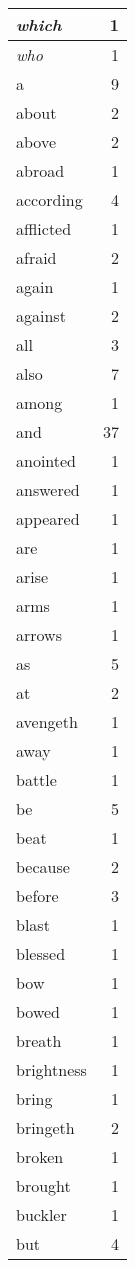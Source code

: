 \begin{center}
\begin{longtable}{l|r}
\emph{which} & 1 \\ \hline
\emph{who} & 1 \\ \hline
a & 9 \\ \hline
about & 2 \\ \hline
above & 2 \\ \hline
abroad & 1 \\ \hline
according & 4 \\ \hline
afflicted & 1 \\ \hline
afraid & 2 \\ \hline
again & 1 \\ \hline
against & 2 \\ \hline
all & 3 \\ \hline
also & 7 \\ \hline
among & 1 \\ \hline
and & 37 \\ \hline
anointed & 1 \\ \hline
answered & 1 \\ \hline
appeared & 1 \\ \hline
are & 1 \\ \hline
arise & 1 \\ \hline
arms & 1 \\ \hline
arrows & 1 \\ \hline
as & 5 \\ \hline
at & 2 \\ \hline
avengeth & 1 \\ \hline
away & 1 \\ \hline
battle & 1 \\ \hline
be & 5 \\ \hline
beat & 1 \\ \hline
because & 2 \\ \hline
before & 3 \\ \hline
blast & 1 \\ \hline
blessed & 1 \\ \hline
bow & 1 \\ \hline
bowed & 1 \\ \hline
breath & 1 \\ \hline
brightness & 1 \\ \hline
bring & 1 \\ \hline
bringeth & 2 \\ \hline
broken & 1 \\ \hline
brought & 1 \\ \hline
buckler & 1 \\ \hline
but & 4 \\ \hline

\end{longtable}
\end{center}
